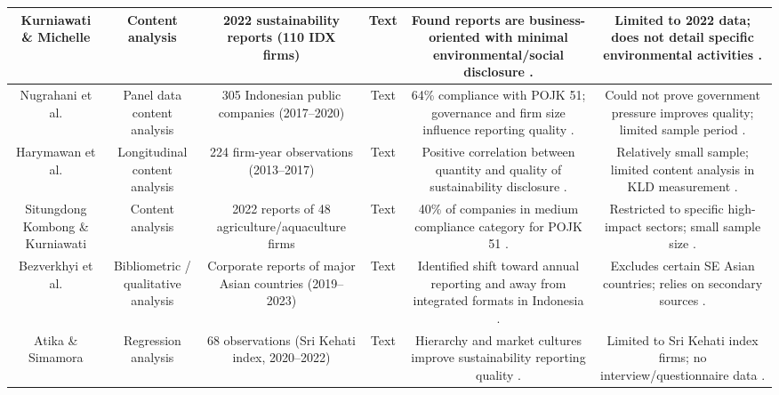 \documentclass{article}
\begin{document}
\begin{table}[h!]
\begin{tabular}{|c|c|c|c|c|c|}
Kurniawati \& Michelle  \parencite{anggreni_dian_kurniawati_938acf6c} & Content analysis & 2022 sustainability reports (110 IDX firms) & Text & Found reports are business-oriented with minimal environmental/social disclosure  \parencite{anggreni_dian_kurniawati_938acf6c}. & Limited to 2022 data; does not detail specific environmental activities  \parencite{anggreni_dian_kurniawati_938acf6c}. \\ \hline
Nugrahani et al.  \parencite{tri_siwi_nugrahani_056a6914} & Panel data content analysis & 305 Indonesian public companies (2017–2020) & Text & 64\% compliance with POJK 51; governance and firm size influence reporting quality  \parencite{tri_siwi_nugrahani_056a6914}. & Could not prove government pressure improves quality; limited sample period  \parencite{tri_siwi_nugrahani_056a6914}. \\ \hline
Harymawan et al.  \parencite{iman_harymawan_2ef898fe} & Longitudinal content analysis & 224 firm-year observations (2013–2017) & Text & Positive correlation between quantity and quality of sustainability disclosure  \parencite{iman_harymawan_2ef898fe}. & Relatively small sample; limited content analysis in KLD measurement  \parencite{iman_harymawan_2ef898fe}. \\ \hline
Situngdong Kombong \& Kurniawati  \parencite{christine_bawaeda_sitandung_kombong_d03ec902} & Content analysis & 2022 reports of 48 agriculture/aquaculture firms & Text & 40\% of companies in medium compliance category for POJK 51  \parencite{christine_bawaeda_sitandung_kombong_d03ec902}. & Restricted to specific high-impact sectors; small sample size  \parencite{christine_bawaeda_sitandung_kombong_d03ec902}. \\ \hline
Bezverkhyi et al.  \parencite{kostiantyn_bezverkhyi_e3819b1b} & Bibliometric / qualitative analysis & Corporate reports of major Asian countries (2019–2023) & Text & Identified shift toward annual reporting and away from integrated formats in Indonesia  \parencite{kostiantyn_bezverkhyi_e3819b1b}. & Excludes certain SE Asian countries; relies on secondary sources  \parencite{kostiantyn_bezverkhyi_e3819b1b}. \\ \hline
Atika \& Simamora  \parencite{atika_atika_588ee68a} & Regression analysis & 68 observations (Sri Kehati index, 2020–2022) & Text & Hierarchy and market cultures improve sustainability reporting quality  \parencite{atika_atika_588ee68a}. & Limited to Sri Kehati index firms; no interview/questionnaire data  \parencite{atika_atika_588ee68a}. \\ \hline

\end{tabular}
\end{table}
\end{document}
